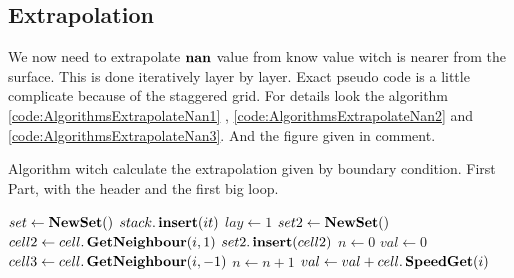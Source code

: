 \subsection{Extrapolation}

We now need to extrapolate $\mathop{\textbf{nan}}$ value from know value witch is nearer from the surface.
This is done iteratively layer by layer.
Exact pseudo code is a little complicate because of the staggered grid. For details look the algorithm  \ref{code:AlgorithmsExtrapolateNan1}
, \ref{code:AlgorithmsExtrapolateNan2} and \ref{code:AlgorithmsExtrapolateNan3}. And the figure given in comment.

\begin{algorithm}
\caption{Algorithm witch calculate the extrapolation given by boundary condition. First Part, with the header and the first big loop.}
\label{code:AlgorithmsExtrapolateNan1}
\begin{algorithmic}[1]
\State $set \gets \mathop{\textbf{NewSet}}()$
	\State  $stack.\mathop{\textbf{insert}}(it)$ 
	\EndIf
	\EndFor
	\State $lay \gets 1$
	\Loop
	\State $set2 \gets \mathop{\textbf{NewSet}}()$
	 
		\State $cell2 \gets cell.\mathop{\textbf{GetNeighbour}}(i,1)$ 
			 
				\State $set2.\mathop{\textbf{insert}}(cell2)$
			\EndIf
			 
			\State $n \gets 0$ 
			\State $val \gets 0$ 
			 
				 
				 
					\State $cell3 \gets cell.\mathop{\textbf{GetNeighbour}}(i,-1)$
						\State $n\gets n+1$
						\State $val \gets val+cell.\mathop{\textbf{SpeedGet}}(i)$
					\EndIf

\end{algorithmic}
\end{algorithm}
